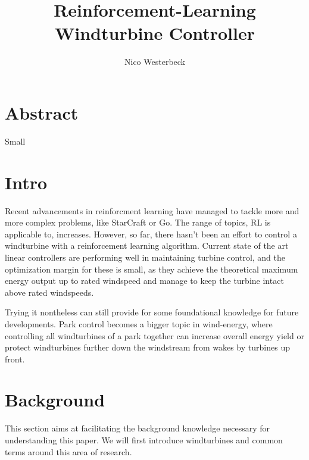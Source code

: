 \documentclass[hyperref,german,beleg]{cgvpub}
\author{Nico Westerbeck}
\title{Reinforcement-Learning Windturbine Controller}
\begin{document}
\chapter{Abstract}
Small 


\chapter{Intro}

Recent advancements in reinforcment learning have managed to tackle more and more complex problems, like StarCraft or Go. The range of topics, RL is applicable to, increases. However, so far, there hasn't been an effort to control a windturbine with a reinforcement learning algorithm. Current state of the art linear controllers are performing well in maintaining turbine control, and the optimization margin for these is small, as they achieve the theoretical maximum energy output up to rated windspeed and manage to keep the turbine intact above rated windspeeds.

Trying it nontheless can still provide for some foundational knowledge for future developments. Park control becomes a bigger topic in wind-energy, where controlling all windturbines of a park together can increase overall energy yield or protect windturbines further down the windstream from wakes by turbines up front. 


\chapter{Background}

This section aims at facilitating the background knowledge necessary for understanding this paper. We will first introduce windturbines and common terms around this area of research.
\end{document}
